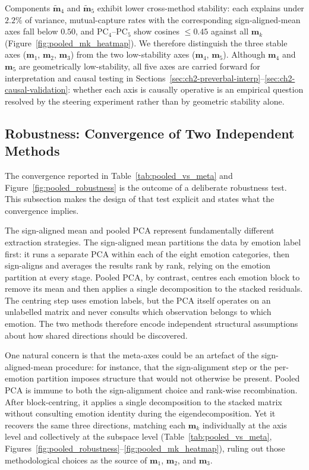 Components $\tilde{\mathbf{m}}_4$ and $\tilde{\mathbf{m}}_5$ exhibit lower cross-method stability: each explains under $2.2\%$ of variance, mutual-capture rates with the corresponding sign-aligned-mean axes fall below $0.50$, and PC$_4$--PC$_5$ show cosines $\leq 0.45$ against all $\mathbf{m}_k$ (Figure~\ref{fig:pooled_mk_heatmap}). We therefore distinguish the three stable axes ($\mathbf{m}_1$, $\mathbf{m}_2$, $\mathbf{m}_3$) from the two low-stability axes ($\mathbf{m}_4$, $\mathbf{m}_5$). Although $\mathbf{m}_4$ and $\mathbf{m}_5$ are geometrically low-stability, all five axes are carried forward for interpretation and causal testing in Sections~\ref{sec:ch2-preverbal-interp}--\ref{sec:ch2-causal-validation}: whether each axis is causally operative is an empirical question resolved by the steering experiment rather than by geometric stability alone.\par

\subsection{Robustness: Convergence of Two Independent Methods}
\label{sec:ch2-pooled-robustness}

The convergence reported in Table~\ref{tab:pooled_vs_meta} and Figure~\ref{fig:pooled_robustness} is the outcome of a deliberate robustness test. This subsection makes the design of that test explicit and states what the convergence implies.\par

The sign-aligned mean and pooled PCA represent fundamentally different extraction strategies. The sign-aligned mean partitions the data by emotion label first: it runs a separate PCA within each of the eight emotion categories, then sign-aligns and averages the results rank by rank, relying on the emotion partition at every stage. Pooled PCA, by contrast, centres each emotion block to remove its mean and then applies a single decomposition to the stacked residuals. The centring step uses emotion labels, but the PCA itself operates on an unlabelled matrix and never consults which observation belongs to which emotion. The two methods therefore encode independent structural assumptions about how shared directions should be discovered.\par

One natural concern is that the meta-axes could be an artefact of the sign-aligned-mean procedure: for instance, that the sign-alignment step or the per-emotion partition imposes structure that would not otherwise be present. Pooled PCA is immune to both the sign-alignment choice and rank-wise recombination. After block-centring, it applies a single decomposition to the stacked matrix without consulting emotion identity during the eigendecomposition. Yet it recovers the same three directions, matching each $\mathbf{m}_k$ individually at the axis level and collectively at the subspace level (Table~\ref{tab:pooled_vs_meta}, Figures~\ref{fig:pooled_robustness}--\ref{fig:pooled_mk_heatmap}), ruling out those methodological choices as the source of $\mathbf{m}_1$, $\mathbf{m}_2$, and $\mathbf{m}_3$.\par

